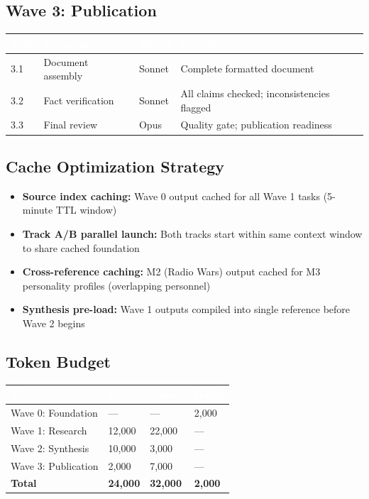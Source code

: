 \documentclass[11pt,letterpaper]{article}
\newcommand{\tableheader}[1]{\textbf{\sffamily\textcolor{white}{#1}}}
\begin{document}
\subsection{Wave 3: Publication}

\begin{center}
\begin{tabularx}{\textwidth}{C{1cm}L{3.5cm}C{1.5cm}X}
\toprule
{}
\tableheader{Task} & \tableheader{Component} & \tableheader{Model} & \tableheader{Output} \\
 & Document assembly & Sonnet & Complete formatted document \\
3.2 & Fact verification & Sonnet & All claims checked; inconsistencies flagged \\
3.3 & Final review & Opus & Quality gate; publication readiness \\
\bottomrule
\end{tabularx}
\end{center}

\subsection{Cache Optimization Strategy}

\begin{itemize}[leftmargin=2em]
\item \textbf{Source index caching:} Wave 0 output cached for all Wave 1 tasks (5-minute TTL window)
\item \textbf{Track A/B parallel launch:} Both tracks start within same context window to share cached foundation
\item \textbf{Cross-reference caching:} M2 (Radio Wars) output cached for M3 personality profiles (overlapping personnel)
\item \textbf{Synthesis pre-load:} Wave 1 outputs compiled into single reference before Wave 2 begins
\end{itemize}

\subsection{Token Budget}

\begin{center}
\begin{tabularx}{\textwidth}{L{4cm}C{2cm}C{2cm}C{2cm}}
\toprule
{}
\tableheader{Wave} & \tableheader{Opus} & \tableheader{Sonnet} & \tableheader{Haiku} \\
\midrule
Wave 0: Foundation & --- & --- & 2,000 \\
Wave 1: Research & 12,000 & 22,000 & --- \\
Wave 2: Synthesis & 10,000 & 3,000 & --- \\
Wave 3: Publication & 2,000 & 7,000 & --- \\
\midrule
\textbf{Total} & \textbf{24,000} & \textbf{32,000} & \textbf{2,000} \\
\bottomrule
\end{tabularx}
\end{center}
\end{document}

